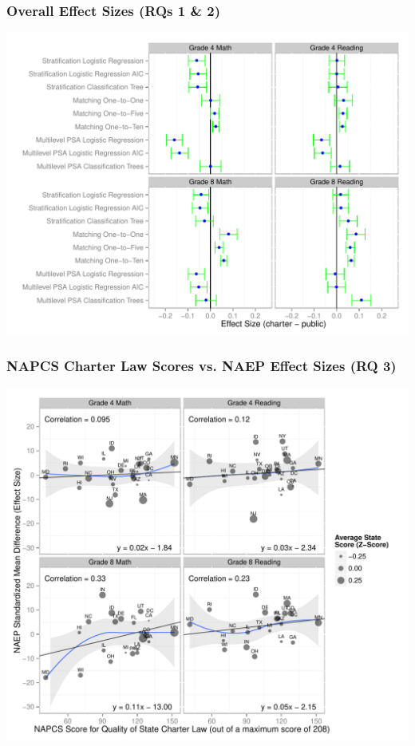\documentclass[10pt,handout,mathserif]{beamer}
\begin{document}
\begin{frame}[c]
	\frametitle{Overall Effect Sizes (RQs 1 \& 2)}
	\begin{center}
	\includegraphics[width=0.85\paperwidth,keepaspectratio]{../Figures2009/Overall}
	\end{center}
\end{frame}

\begin{frame}[c]
	\frametitle{NAPCS Charter Law Scores vs. NAEP Effect Sizes (RQ 3)}
	\begin{center}
	\includegraphics[height=.85\textheight,keepaspectratio]{../Figures2009/LawScoresVsNAEPDifferences}
	\end{center}
\end{frame}
\end{document}
